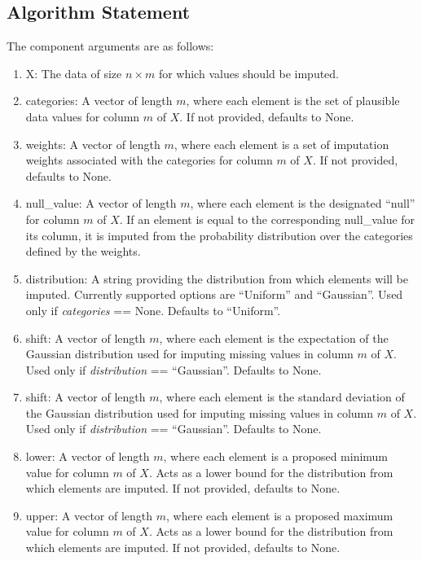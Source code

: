 \documentclass[11pt]{scrartcl} %
\begin{document}
\subsection{Algorithm Statement}
The component arguments are as follows:
\begin{enumerate}
    \item X: The data of size $n \times m$ for which values should be imputed.
    \item categories: A vector of length $m$, where each element is the set of plausible data values 
                      for column $m$ of $X$. If not provided, defaults to None.
    \item weights: A vector of length $m$, where each element is a set of imputation weights associated with the categories 
                   for column $m$ of $X$. If not provided, defaults to None.
    \item null\_value: A vector of length $m$, where each element is the designated ``null'' 
                      for column $m$ of $X$. If an element is equal to the corresponding null\_value
                      for its column, it is imputed from the probability distribution over the categories
                      defined by the weights.
    \item distribution: A string providing the distribution from which elements will be imputed. 
                        Currently supported options are ``Uniform'' and ``Gaussian''. 
                        Used only if \emph{categories} == None. 
                        Defaults to ``Uniform''.
    \item shift: A vector of length $m$, where each element is the expectation of the Gaussian distribution used 
                 for imputing missing values in column $m$ of $X$. Used only if \emph{distribution} == ``Gaussian''.
                 Defaults to None. 
    \item shift: A vector of length $m$, where each element is the standard deviation of the Gaussian distribution used 
                 for imputing missing values in column $m$ of $X$. Used only if \emph{distribution} == ``Gaussian''.
                 Defaults to None. 
    \item lower: A vector of length $m$, where each element is a proposed minimum value for column $m$ of $X$.
                 Acts as a lower bound for the distribution from which elements are imputed.
                 If not provided, defaults to None.
    \item upper: A vector of length $m$, where each element is a proposed maximum value for column $m$ of $X$.
                 Acts as a lower bound for the distribution from which elements are imputed.
                 If not provided, defaults to None. 
\end{enumerate}
\end{document}
